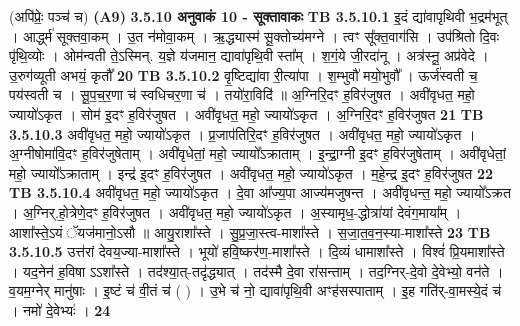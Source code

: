 \documentclass[17pt]{extarticle}
\begin{document}
{{{{{{{{{{{{{{{{{{{                  \newline
                                    (अपि॑प्रेः॒ पञ्च॑ च) \textbf{(A9)} \newline \newline
                \textbf{ 3.5.10    अनुवाकं   10 - सूक्तावाकः} \newline
                                \textbf{ TB 3.5.10.1} \newline
                  इ॒दं द्या॑वापृथिवी भ॒द्रम॑भूत् । आर्द्ध्म॑ सूक्तवा॒कम् । उ॒त न॑मोवा॒कम् । ऋ॒द्ध्यास्म॑ सू॒क्तोच्य॑मग्ने । त्वꣳ सू᳚क्त॒वाग॑सि । उप॑श्रितो दि॒वः पृ॑थि॒व्योः । ओम॑न्वती ते॒ऽस्मिन्. य॒ज्ञे य॑जमान॒ द्यावा॑पृथि॒वी स्ता᳚म् । श॒गं॒ये जी॒रदा॑नू । अत्र॑स्नू॒ अप्र॑वेदे । उ॒रुग॑व्यूती अभयं॒ कृतौ᳚ \textbf{ 20} \newline
                  \newline
                                \textbf{ TB 3.5.10.2} \newline
                  वृ॒ष्टिद्या॑वा री॒त्या॑पा । श॒म्भुवौ॑ मयो॒भुवौ᳚ । ऊर्ज॑स्वती च॒ पय॑स्वती च । सू॒प॒च॒र॒णा च॑ स्वधिचर॒णा च॑ ।  तयो॑रा॒विदि॑ ॥ अ॒ग्निरि॒दꣳ ह॒विर॑जुषत । अवी॑वृधत॒ महो॒ ज्यायो॑ऽकृत । सोम॑ इ॒दꣳ ह॒विर॑जुषत । अवी॑वृधत॒ महो॒ ज्यायो॑ऽकृत । अ॒ग्निरि॒दꣳ ह॒विर॑जुषत \textbf{ 21} \newline
                  \newline
                                \textbf{ TB 3.5.10.3} \newline
                  अवी॑वृधत॒ महो॒ ज्यायो॑ऽकृत । प्र॒जाप॑तिरि॒दꣳ ह॒विर॑जुषत । अवी॑वृधत॒ महो॒ ज्यायो॑ऽकृत । अ॒ग्नीषोमा॑वि॒दꣳ ह॒विर॑जुषेताम् । अवी॑वृधेतां॒ महो॒ ज्यायो᳚ऽक्राताम् । इ॒न्द्रा॒ग्नी इ॒दꣳ ह॒विर॑जुषेताम् । अवी॑वृधेतां॒ महो॒ ज्यायो᳚ऽक्राताम् । इन्द्र॑ इ॒दꣳ ह॒विर॑जुषत । अवी॑वृधत॒ महो॒ ज्यायो॑ऽकृत । म॒हे॒न्द्र इ॒दꣳ ह॒विर॑जुषत \textbf{ 22} \newline
                  \newline
                                \textbf{ TB 3.5.10.4} \newline
                  अवी॑वृधत॒ महो॒ ज्यायो॑ऽकृत । दे॒वा आ᳚ज्य॒पा आज्य॑मजुषन्त । अवी॑वृधन्त॒ महो॒ ज्यायो᳚ऽक्रत । अ॒ग्निर्.हो॒त्रेणे॒दꣳ ह॒विर॑जुषत । अवी॑वृधत॒ महो॒ ज्यायो॑ऽकृत । अ॒स्यामृध॒-द्धोत्रा॑यां देवंग॒माया᳚म् । आशा᳚स्ते॒ऽयं ॅयज॑मानो॒ऽसौ ॥ आयु॒राशा᳚स्ते । सु॒प्र॒जा॒स्त्व-माशा᳚स्ते । स॒जा॒त॒व॒न॒स्या-माशा᳚स्ते \textbf{ 23} \newline
                  \newline
                                \textbf{ TB 3.5.10.5} \newline
                  उत्त॑रां देवय॒ज्या-माशा᳚स्ते । भूयो॑ हवि॒ष्कर॑ण॒-माशा᳚स्ते । दि॒व्यं धामाशा᳚स्ते । विश्वं॑ प्रि॒यमाशा᳚स्ते । यद॒नेन॑ ह॒विषा ऽऽशा᳚स्ते । तद॑श्या॒त्-तदृ॑द्ध्यात् । तद॑स्मै दे॒वा रा॑सन्ताम् । तद॒ग्निर्-दे॒वो दे॒वेभ्यो॒ वन॑ते । व॒यम॒ग्नेर् मानु॑षाः । इ॒ष्टं च॑ वी॒तं च॑ ( ) । उ॒भे च॑ नो॒ द्यावा॑पृथि॒वी अꣳह॑सस्पाताम् । इ॒ह गति॑र्-वा॒मस्ये॒दं च॑ । नमो॑ दे॒वेभ्यः॑ । \textbf{ 24} \newline
}}}}}}}}}}}}}}}}}}}
\end{document}
